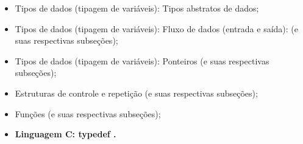 \documentclass[12pt]{article}
\begin{document}
\hspace{0.25cm}
\begin{tcolorbox}[colback=violet!5!white,colframe=violet!75!white,title=Capítulos recomendados:]
    \begin{itemize}
        \item Tipos de dados (tipagem de variáveis): Tipos abstratos de dados;
        \item Tipos de dados (tipagem de variáveis): Fluxo de dados (entrada e saída): (e suas respectivas subseções);
        \item Tipos de dados (tipagem de variáveis): Ponteiros (e suas respectivas subseções);
        \item Estruturas de controle e repetição (e suas respectivas subseções);
        \item Funções (e suas respectivas subseções);
        \item \textbf{Linguagem C: typedef \cite{site:typedef}.}
    \end{itemize}
\end{tcolorbox}
\end{document}
